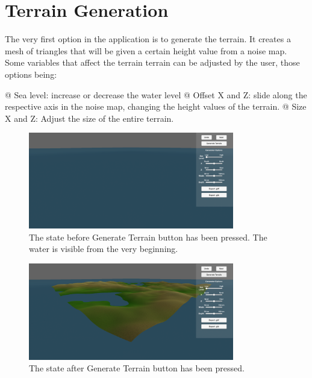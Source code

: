 \section{Terrain Generation}

The very first option in the application is to generate the terrain. It creates a mesh of triangles that will be given a certain height value from a noise map. Some variables that affect the terrain terrain can be adjusted by the user, those options being:

\begin{easylist}
 @ Sea level: increase or decrease the water level
 @ Offset X and Z: slide along the respective axis in the noise map, changing the height values of the terrain.
 @ Size X and Z: Adjust the size of the entire terrain.
\end{easylist}


\begin{figure}[h!]
  \centering

  \includegraphics[width=0.8\textwidth]{figure/terrain_not_generated.png}
  \caption{The state before Generate Terrain button has been pressed. The water is visible from the very beginning.}

  \label{fig:no_terr}
\end{figure}

\begin{figure}[h!]
  \centering

  \includegraphics[width=0.8\textwidth]{figure/terrain_generated.png}
  \caption{The state after Generate Terrain button has been pressed.}

  \label{fig:terr}
\end{figure}
